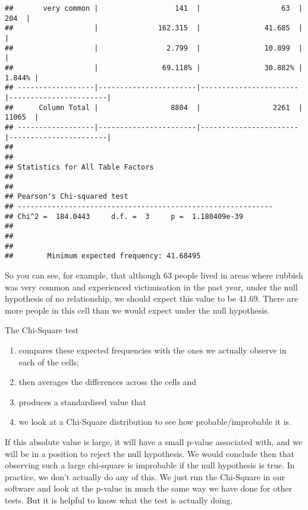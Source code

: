 \documentclass[
]{book}
\providecommand{\tightlist}{%
  \setlength{\itemsep}{0pt}\setlength{\parskip}{0pt}}
\begin{document}
\begin{verbatim}
##       very common |                  141  |                   63  |                  204  | 
##                   |              162.315  |               41.685  |                       | 
##                   |                2.799  |               10.899  |                       | 
##                   |               69.118% |               30.882% |                1.844% | 
## ------------------|-----------------------|-----------------------|-----------------------|
##      Column Total |                 8804  |                 2261  |                11065  | 
## ------------------|-----------------------|-----------------------|-----------------------|
## 
##  
## Statistics for All Table Factors
## 
## 
## Pearson's Chi-squared test 
## ------------------------------------------------------------
## Chi^2 =  184.0443     d.f. =  3     p =  1.180409e-39 
## 
## 
##  
##        Minimum expected frequency: 41.68495
\end{verbatim}

So you can see, for example, that although 63 people lived in areas where rubbish was very common and experienced victimisation in the past year, under the null hypothesis of no relationship, we should expect this value to be 41.69. There are more people in this cell than we would expect under the null hypothesis.

The Chi-Square test

\begin{enumerate}
\def\labelenumi{(\arabic{enumi})}
\tightlist
\item
  compares these expected frequencies with the ones we actually observe in each of the cells;
\item
  then averages the differences across the cells and
\item
  produces a standardised value that
\item
  we look at a Chi-Square distribution to see how probable/improbable it is.
\end{enumerate}

If this absolute value is large, it will have a small p-value associated with, and we will be in a position to reject the null hypothesis. We would conclude then that observing such a large chi-square is improbable if the null hypothesis is true. In practice, we don't actually do any of this. We just run the Chi-Square in our software and look at the p-value in much the same way we have done for other tests. But it is helpful to know what the test is actually doing.
\end{document}
